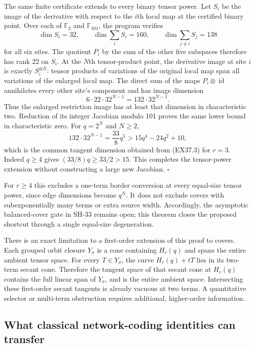 The same finite certificate extends to every binary tensor
power. Let $S_i$ be the image of the derivative with respect
to the $i$th local map at the certified binary point.
Over each of $\mathbb F_2$ and $\mathbb F_{101}$, the
program verifies
\[
 \dim S_i=32,\qquad
 \dim\sum_iS_i=160,\qquad
 \dim\sum_{j\ne i}S_j=138
\]
for all six sites. The quotient $P_i$ by the sum of the
other five subspaces therefore has rank 22 on $S_i$.
At the $N$th tensor-product point, the derivative image
at site $i$ is exactly $S_i^{\otimes N}$: tensor products
of variations of the original local map span all variations
of the enlarged local map. The direct sum of the maps
$P_i\otimes\operatorname{id}$ annihilates every other
site's component and has image dimension
\[
 6\cdot22\cdot32^{N-1}=132\cdot32^{N-1}.
 \tag{EX37.6}
\]
Thus the enlarged restriction image has at least that
dimension in characteristic two. Reduction of its integer
Jacobian modulo 101 proves the same lower bound in
characteristic zero. For $q=2^N$ and $N\ge2$,
\[
 132\cdot32^{N-1}=\frac{33}{8}q^5
 >15q^4-24q^2+10,
\]
which is the common tangent dimension obtained from
(EX37.3) for $r=3$. Indeed $q\ge4$ gives
$(33/8)q\ge33/2>15$. This completes the tensor-power
extension without constructing a large new Jacobian.
\hfill$\square$

For $r\ge4$ this excludes a one-term border conversion
at every equal-size tensor power, since edge dimensions
become $q^N$. It does not exclude covers with
subexponentially many terms or extra source width.
Accordingly, the asymptotic balanced-cover gate in SH-33
remains open; this theorem closes the proposed shortcut
through a single equal-size degeneration.

There is an exact limitation to a first-order extension of
this proof to covers. Each grouped orbit closure $Y_\sigma$
is a cone containing $H_r(q)$ and spans the entire ambient
tensor space. For every $T\in Y_\sigma$, the curve
$H_r(q)+tT$ lies in its two-term secant cone. Therefore
the tangent space of that secant cone at $H_r(q)$ contains
the full linear span of $Y_\sigma$, and is the entire
ambient space. Intersecting these first-order secant
tangents is already vacuous at two terms. A quantitative
selector or multi-term obstruction requires additional,
higher-order information.

\subsection{What classical network-coding identities can transfer}
\label{sec:ex-coding-transfer}

